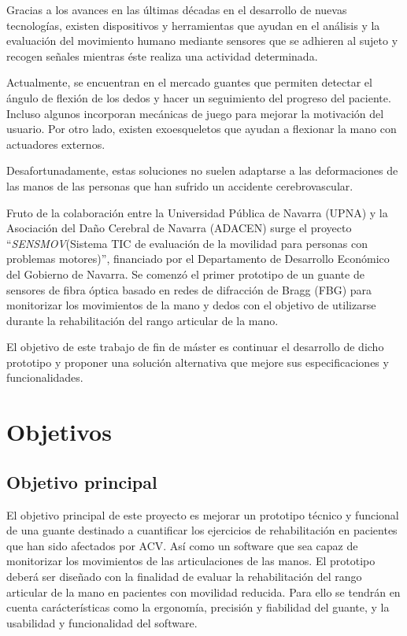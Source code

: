 Gracias a los avances en las últimas décadas en el desarrollo de nuevas tecnologías, existen dispositivos y herramientas que ayudan en el análisis y la evaluación del movimiento humano mediante sensores que se adhieren al sujeto y recogen señales mientras éste realiza una actividad determinada.

Actualmente, se encuentran en el mercado guantes que permiten detectar el ángulo de flexión de los dedos y hacer un seguimiento del progreso del paciente. Incluso algunos incorporan mecánicas de juego para mejorar la motivación del usuario. Por otro lado, existen exoesqueletos que ayudan a flexionar la mano con actuadores externos.

Desafortunadamente, estas soluciones no suelen adaptarse a las deformaciones de las manos de las personas que han sufrido un accidente cerebrovascular.

Fruto de la colaboración entre la Universidad Pública de Navarra (UPNA) y la Asociación del Daño Cerebral de Navarra	(ADACEN) surge el proyecto ``\textit{SENSMOV}(Sistema TIC de evaluación de la movilidad para personas con problemas motores)'', financiado por el Departamento de Desarrollo Económico del Gobierno de Navarra. Se comenzó el primer prototipo de un guante de sensores de fibra óptica basado en redes de difracción de Bragg (FBG) para monitorizar los movimientos de la mano y dedos con el objetivo de utilizarse durante la rehabilitación del rango articular de la mano.


El objetivo de este trabajo de fin de máster es continuar el desarrollo de dicho prototipo y proponer una solución alternativa que mejore sus especificaciones y funcionalidades. 



\section{Objetivos}
\label{sec:objetivos1}
 

\subsection{Objetivo principal}
\label{sec:objPrinc1}

El objetivo principal de este proyecto es mejorar un prototipo técnico y funcional de una guante destinado a cuantificar los ejercicios de rehabilitación en pacientes que han sido afectados por ACV. Así como un software que sea capaz de monitorizar los movimientos de las articulaciones de las manos. El prototipo deberá ser diseñado con la finalidad de evaluar la rehabilitación del rango articular de la mano en pacientes con movilidad reducida. Para ello se tendrán en cuenta carácterísticas como la ergonomía, precisión y fiabilidad del guante, y la usabilidad y funcionalidad del software. 

